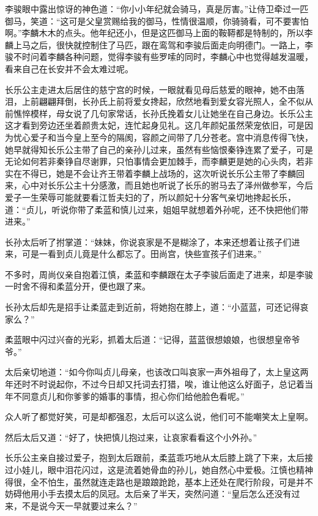 李骏眼中露出惊讶的神色道：“你小小年纪就会骑马，真是厉害。”让侍卫牵过一匹御马，笑道：“这可是父皇赏赐给我的御马，性情很温顺，你骑骑看，可不要害怕啊。”李麟木木的点头。他年纪还小，但是这匹御马上面的鞍鞯都是特制的，所以李麟上马之后，很快就控制住了马匹，跟在鸾驾和李骏后面走向明德门。一路上，李骏不时问着李麟各种问题，觉得李骏有些罗嗦的同时，李麟心中也觉得越发温暖，看来自己在长安并不会太难过呢。

长乐公主走进太后居住的慈宁宫的时候，一眼就看见母后慈爱的眼神，她不由落泪，上前翩翩拜倒，长孙氏上前将爱女搀起，欣然地看到爱女容光照人，全不似从前憔悴模样，母女说了几句家常话，长孙氏挽着女儿让她坐在自己身边。长乐公主这才看到旁边还坐着颜贵太妃，连忙起身见礼。这几年颜妃虽然荣宠依旧，可是因为忧心爱子和当今皇上至今的隔阂，容颜之间带了几分苍老。宫中消息传得飞快，她早就得知长乐公主带了自己的亲孙儿过来，虽然有些恼恨秦铮连累了爱子，可是无论如何若非秦铮自尽谢罪，只怕事情会更加棘手，而李麟更是她的心头肉，若非实在不得已，她是不会让齐王带着李麟上战场的，这次听说长乐公主带了李麟回来，心中对长乐公主十分感激，而且她也听说了长乐的驸马去了泽州做参军，今后爱子一生荣辱可能就要看江哲夫妇的了，所以颜妃十分客气亲切地搀起长乐，道：“贞儿，听说你带了柔蓝和慎儿过来，姐姐早就想着外孙呢，还不快把他们带进来。”

长孙太后听了拊掌道：“妹妹，你说哀家是不是糊涂了，本来还想着让孩子们进来，可是一看到贞儿竟是什么都忘了。田尚宫，快些宣孩子们进来。”

不多时，周尚仪亲自抱着江慎，柔蓝和李麟跟在太子李骏后面走了进来，却是李骏一时舍不得和柔蓝分开，便也跟了来。

长孙太后却先是招手让柔蓝走到近前，将她抱在膝上，道：“小蓝蓝，可还记得哀家么？”

柔蓝眼中闪过兴奋的光彩，抓着太后道：“记得，蓝蓝很想娘娘，也很想皇帝爷爷。”

太后亲切地道：“如今你叫贞儿母亲，也该改口叫哀家一声外祖母了，太上皇这两年还时不时说起你，不过今日却又托词去打猎，唉，谁让他这么好面子，总记着当年不同意贞儿和你爹爹的婚事的事情，担心你们给他脸色看呢。”

众人听了都觉好笑，可是却都强忍，太后可以这么说，他们可不能嘲笑太上皇啊。

然后太后又道：“好了，快把慎儿抱过来，让哀家看看这个小外孙。”

长乐公主亲自接过爱子，抱到太后跟前，柔蓝乖巧地从太后膝上跳了下来，太后接过小娃儿，眼中泪花闪过，这是流着她骨血的孙儿，她自然心中爱极。江慎也精神得很，全不怕生，虽然就连走路也是踉踉跄跄，基本上还处在爬行阶段，可是并不妨碍他用小手去摸太后的凤冠。太后亲了半天，突然问道：“皇后怎么还没有过来，不是说今天一早就要过来么？”

